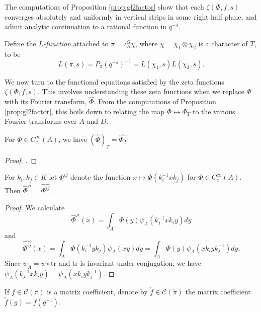 \begin{rem}
    The computations of Proposition \ref{prop:gl2factor} show that each $\zeta(\Phi,f,s)$ converges absolutely and uniformly in vertical strips in some right half plane, and admit analytic continuation to a rational function in $q^{-s}$.
\end{rem}


\begin{defn}
    Define the \textit{$L$-function} attached to $\pi = \iota_B^G \chi$, where $\chi=\chi_1\otimes \chi_2$ is a character of $T$, to be $$L(\pi,s) = P_\pi(q^{-s})^{-1} = L(\chi_1,s)L(\chi_2,s).$$
\end{defn}

We now turn to the functional equations satisfied by the zeta functions $\zeta(\Phi,f,s)$. This involves understanding these zeta functions when we replace $\Phi$ with its Fourier transform, $\hat{\Phi}$. From the computations of Proposition \ref{prop:gl2factor}, this boils down to relating the map $\Phi \mapsto \Phi_T$ to the various Fourier transforms over $A$ and $D$.

\begin{lemma}
    For $\Phi \in C_c^\infty(A)$, we have $(\hat{\Phi})_T = \widehat{\Phi_T}$.
\end{lemma}
\begin{proof}
    \cite[Lemma 26.3]{BH1}.
\end{proof}

\begin{lemma}\label{hat}
    For $k_i,k_j \in K$ let $\Phi^{ij}$ denote the function $x \mapsto \Phi(k_i^{-1}xk_j)$ for $\Phi \in C_c^\infty(A)$. Then $\hat\Phi^{ji} = \widehat{\Phi^{ij}}$. 
\end{lemma}
\begin{proof}
    We calculate 
    $$\hat\Phi^{ji}(x) = \int_A \Phi(y)\psi_A(k_j^{-1}xk_iy)dy$$
    and 
    $$\widehat{\Phi^{ij}}(x) = \int_A\Phi(k_i^{-1}yk_j)\psi_A(xy)dy = \int_A \Phi(y)\psi_A(xk_iyk_j^{-1})dy.$$
    Since $\psi_A = \psi \circ \mathrm{tr}$ and $\mathrm{tr}$ is invariant under conjugation, we have $\psi_A(k_j^{-1}xk_iy) = \psi_A(xk_iyk_j^{-1})$.
\end{proof}

\begin{notn}
    If $f \in \mathcal C(\pi)$ is a matrix coefficient, denote by $\check{f} \in \mathcal C(\check\pi)$ the matrix coefficient
    $\check{f}(g) = f(g^{-1})$.
\end{notn}

